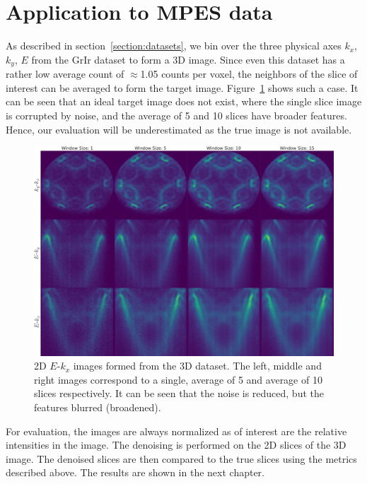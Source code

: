 \section{Application to MPES data}

As described in section~\ref{section:datasets}, we bin over the three physical axes $k_x$, $k_y$, $E$ from the \gls{GrIr} dataset to form a 3D image. Since even this dataset has a rather low average count of $\approx$1.05 counts per voxel, the neighbors of the slice of interest can be averaged to form the target image. Figure~\ref{fig:slices} shows such a case. It can be seen that an ideal target image does not exist, where the single slice image is corrupted by noise, and the average of 5 and 10 slices have broader features. Hence, our evaluation will be underestimated as the true image is not available.

\begin{figure}[t]
    \centering
    \includegraphics[width=1\linewidth]{images/slices.pdf}
    \caption{2D $E$-$k_x$ images formed from the 3D dataset. The left, middle and right images correspond to a single, average of 5 and average of 10 slices respectively. It can be seen that the noise is reduced, but the features blurred (broadened).}
    \label{fig:slices}
\end{figure}

For evaluation, the images are always normalized as of interest are the relative intensities in the image. The denoising is performed on the 2D slices of the 3D image. The denoised slices are then compared to the true slices using the metrics described above. The results are shown in the next chapter.
